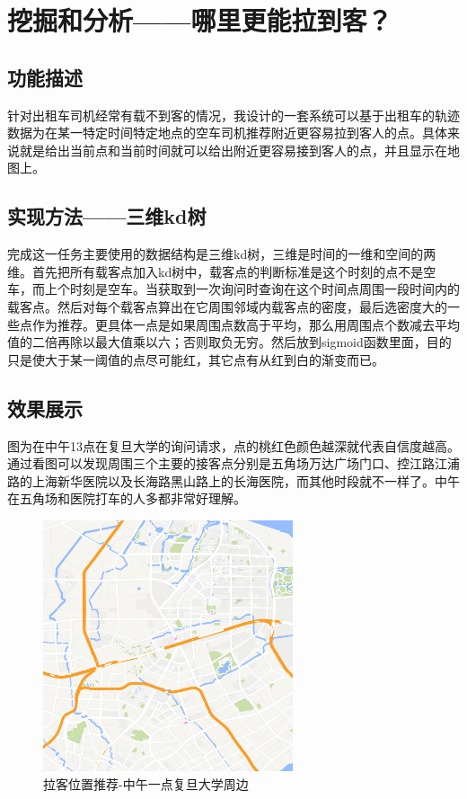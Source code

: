 \documentclass[10pt]{scrartcl}
\begin{document}
\section{挖掘和分析——哪里更能拉到客？}
\subsection{功能描述}
针对出租车司机经常有载不到客的情况，我设计的一套系统可以基于出租车的轨迹数据为在某一特定时间特定地点的空车司机推荐附近更容易拉到客人的点。具体来说就是给出当前点和当前时间就可以给出附近更容易接到客人的点，并且显示在地图上。

\subsection{实现方法——三维kd树}
完成这一任务主要使用的数据结构是三维kd树，三维是时间的一维和空间的两维。首先把所有载客点加入kd树中，载客点的判断标准是这个时刻的点不是空车，而上个时刻是空车。当获取到一次询问时查询在这个时间点周围一段时间内的载客点。然后对每个载客点算出在它周围邻域内载客点的密度，最后选密度大的一些点作为推荐。更具体一点是如果周围点数高于平均，那么用周围点个数减去平均值的二倍再除以最大值乘以六；否则取负无穷。然后放到sigmoid函数里面，目的只是使大于某一阈值的点尽可能红，其它点有从红到白的渐变而已。

\subsection{效果展示}
图为在中午13点在复旦大学的询问请求，点的桃红色颜色越深就代表自信度越高。通过看图可以发现周围三个主要的接客点分别是五角场万达广场门口、控江路江浦路的上海新华医院以及长海路黑山路上的长海医院，而其他时段就不一样了。中午在五角场和医院打车的人多都非常好理解。

\begin{figure}[htbp] 
\centering\includegraphics[width=2.9in]{taxirecommend} 
\caption{拉客位置推荐-中午一点复旦大学周边}\label{fig:5}
\end{figure} 
\end{document}
